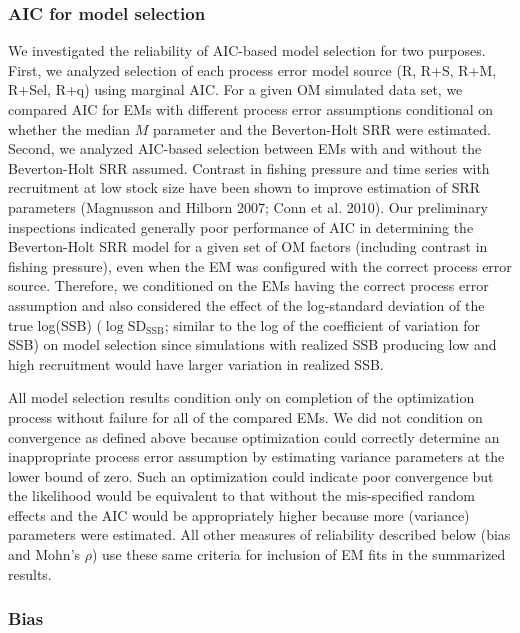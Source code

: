 \documentclass[
  12pt,
]{article}
\begin{document}
\subsubsection*{AIC for model selection}\label{aic-for-model-selection}

We investigated the reliability of AIC-based model selection for two
purposes. First, we analyzed selection of each process error model
source (R, R+S, R+M, R+Sel, R+q) using marginal AIC. For a given OM
simulated data set, we compared AIC for EMs with different process error
assumptions conditional on whether the median \(M\) parameter and the
Beverton-Holt SRR were estimated. Second, we analyzed AIC-based
selection between EMs with and without the Beverton-Holt SRR assumed.
Contrast in fishing pressure and time series with recruitment at low
stock size have been shown to improve estimation of SRR parameters
(Magnusson and Hilborn 2007; Conn et al. 2010). Our preliminary
inspections indicated generally poor performance of AIC in determining
the Beverton-Holt SRR model for a given set of OM factors (including
contrast in fishing pressure), even when the EM was configured with the
correct process error source. Therefore, we conditioned on the EMs
having the correct process error assumption and also considered the
effect of the log-standard deviation of the true log(SSB)
(\(\log \text{SD}_{\text{SSB}}\); similar to the log of the coefficient
of variation for SSB) on model selection since simulations with realized
SSB producing low and high recruitment would have larger variation in
realized SSB.

All model selection results condition only on completion of the
optimization process without failure for all of the compared EMs. We did
not condition on convergence as defined above because optimization could
correctly determine an inappropriate process error assumption by
estimating variance parameters at the lower bound of zero. Such an
optimization could indicate poor convergence but the likelihood would be
equivalent to that without the mis-specified random effects and the AIC
would be appropriately higher because more (variance) parameters were
estimated. All other measures of reliability described below (bias and
Mohn's \(\rho\)) use these same criteria for inclusion of EM fits in the
summarized results.

\subsubsection*{Bias}\label{bias}
\end{document}
